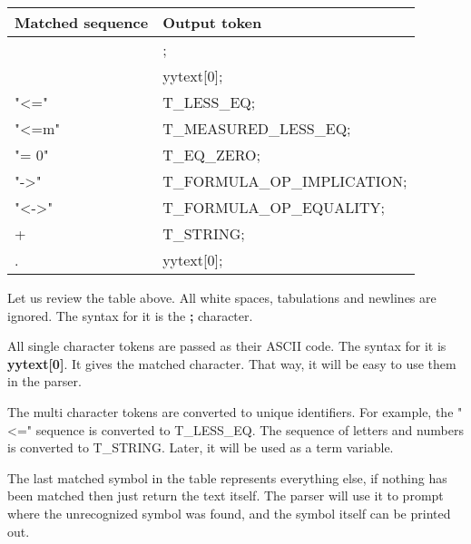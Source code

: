 \documentclass{article}
\begin{document}
		\begin{flushleft}
			\centering
			\begin{tabular}{ | m{10em} | m{15em}| } 
				\hline
					\textbf{Matched sequence} & \textbf{Output token} \\ [0.7ex] 
				\hline
					[ \textbackslash t\textbackslash  n] & ; \\
				\hline
					[,TF01()C\&|~*+-] 	& yytext[0];  \\
				\hline
				    "<="            &   T\_LESS\_EQ; \\
				\hline
				    "<=m"           &   T\_MEASURED\_LESS\_EQ; \\
				\hline
				    "= 0"           &   T\_EQ\_ZERO; \\
				\hline
				    "->"            &   T\_FORMULA\_OP\_IMPLICATION; \\
				\hline
				    "<->"           &   T\_FORMULA\_OP\_EQUALITY; \\
				\hline
				    [a-zA-Z0-9]+    &   T\_STRING; \\
				\hline
				    .               &   yytext[0]; \\
				\hline
			\end{tabular}
		\end{flushleft}
	Let us review the table above. All white spaces, tabulations and newlines are ignored. The syntax for it is the \textbf{;} character.

	All single character tokens are passed as their ASCII code. The syntax for it is \textbf{yytext[0]}. It gives the matched character. That way, it will be easy to use them in the parser.

	The multi character tokens are converted to unique identifiers. For example, the "<=" sequence is converted to T\_LESS\_EQ. The sequence of letters and numbers is converted to T\_STRING. Later, it will be used as a term variable.

	The last matched symbol in the table represents everything else, if nothing has been matched then just return the text itself.
	The parser will use it to prompt where the unrecognized symbol was found, and the symbol itself can be printed out.

\end{document}
